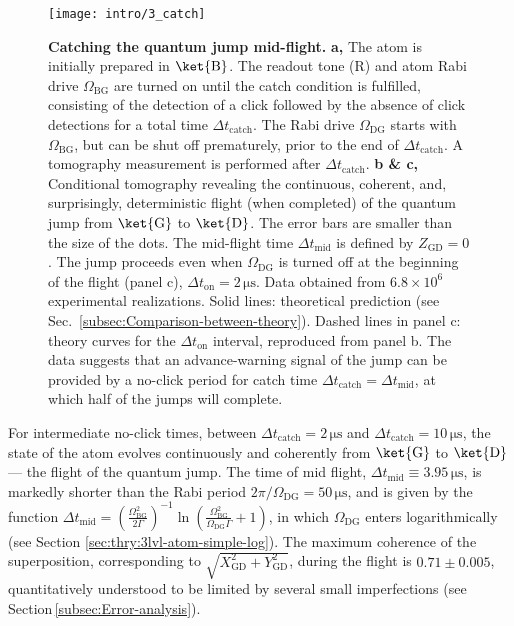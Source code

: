 \begin{figure}
\centering{}\texttt{[image: intro/3\_catch]} \caption[Catching the quantum jump mid-flight]{\label{fig:catch}\textbf{Catching the quantum jump mid-flight.}
\textbf{a,} The atom is initially prepared in $\ket{\mathrm{B}}$.
The readout tone ($\mathrm{R}$) and atom Rabi drive $\Omega_{\mathrm{BG}}$
are turned on until the catch condition is fulfilled, consisting of
the detection of a click followed by the absence of click detections
for a total time $\Delta t_{\mathrm{catch}}$. The Rabi drive $\Omega_{\mathrm{DG}}$
starts with $\Omega_{\mathrm{BG}}$, but can be shut off prematurely,
prior to the end of $\Delta t_{\mathrm{catch}}$. A tomography measurement
is performed after $\Delta t_{\mathrm{catch}}$. \textbf{b \& c,}
Conditional tomography revealing the continuous, coherent, and, surprisingly,
deterministic flight (when completed) of the quantum jump from $\ket{\mathrm{G}}$
to $\ket{\mathrm{D}}$. The error bars are smaller than the size of
the dots. The mid-flight time $\Delta t_{\mathrm{mid}}$ is defined
by $Z_{\mathrm{GD}}=0$. The jump proceeds even when $\Omega_{\mathrm{DG}}$
is turned off at the beginning of the flight (panel c), $\Delta t_{\mathrm{on}}=2\,\mathrm{\mu s}$.
Data obtained from $6.8\times10^{6}$ experimental realizations. Solid
lines: theoretical prediction (see Sec.~\ref{subsec:Comparison-between-theory}).
Dashed lines in panel c: theory curves for the $\Delta t_{\mathrm{on}}$
interval, reproduced from panel b. The data suggests that an advance-warning
signal of the jump can be provided by a no-click period for catch
time $\Delta t_{\mathrm{catch}}=\Delta t_{\mathrm{mid}}$, at which
half of the jumps will complete.}
\end{figure}

For intermediate no-click times, between $\Delta t_{\operatorname{catch}}=2\,\mathrm{\mu s}$
and $\Delta t_{\operatorname{catch}}=10\,\mathrm{\mu s}$, the state
of the atom evolves continuously and coherently from $\ket{\mathrm{G}}$
to $\ket{\mathrm{D}}$ --- the flight of the quantum jump. The time
of mid flight, $\Delta t_{\mathrm{mid}}\equiv3.95\,\mathrm{\mu s}$,
is markedly shorter than the Rabi period $2\pi/\Omega_{\mathrm{DG}}=50\,\mathrm{\mu s}$,
and is given by the function $\Delta t_{\text{mid}}=\left(\frac{\Omega_{\mathrm{BG}}^{2}}{2\Gamma}\right)^{-1}\ln\left(\frac{\Omega_{\mathrm{BG}}^{2}}{\Omega_{\mathrm{DG}}\Gamma}+1\right)$,
in which $\Omega_{\mathrm{DG}}$ enters logarithmically (see Section
\ref{sec:thry:3lvl-atom-simple-log}). The maximum coherence of the
superposition, corresponding to $\sqrt{X_{\mathrm{GD}}^{2}+Y_{\mathrm{GD}}^{2}}$,
during the flight is $0.71\pm0.005$, quantitatively understood to
be limited by several small imperfections (see Section\,\ref{subsec:Error-analysis}).

